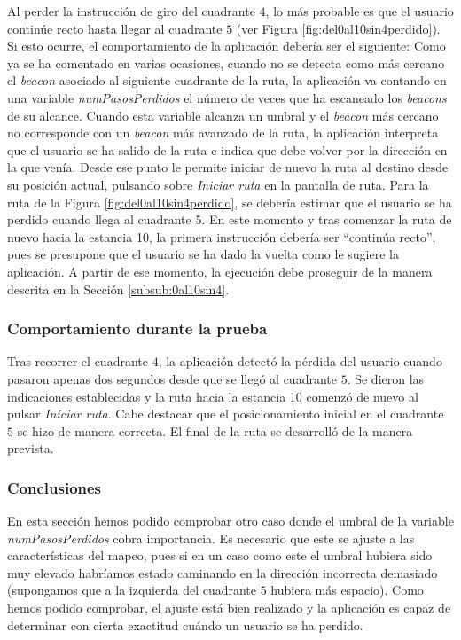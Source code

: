 Al perder la instrucción de giro del cuadrante $4$, lo más probable es que el usuario continúe recto hasta llegar al cuadrante $5$ (ver Figura \ref{fig:del0al10sin4perdido}). Si esto ocurre, el comportamiento de la aplicación debería ser el siguiente: Como ya se ha comentado en varias ocasiones, cuando no se detecta como más cercano el \textit{beacon} asociado al siguiente cuadrante de la ruta, la aplicación va contando en una variable \textit{numPasosPerdidos} el número de veces que ha escaneado los \textit{beacons} de su alcance. Cuando esta variable alcanza un umbral y el \textit{beacon} más cercano no corresponde con un \textit{beacon} más avanzado de la ruta, la aplicación interpreta que el usuario se ha salido de la ruta e indica que debe volver por la dirección en la que venía. Desde ese punto le permite iniciar de nuevo la ruta al destino desde su posición actual, pulsando sobre \textit{Iniciar ruta} en la pantalla de ruta. Para la ruta de la Figura \ref{fig:del0al10sin4perdido}, se debería estimar que el usuario se ha perdido cuando llega al cuadrante $5$. En este momento y tras comenzar la ruta de nuevo hacia la estancia 10, la primera instrucción debería ser ``continúa recto'', pues se presupone que el usuario se ha dado la vuelta como le sugiere la aplicación. A partir de ese momento, la ejecución debe proseguir de la manera descrita en la Sección \ref{subsub:0al10sin4}.

\subsubsection*{Comportamiento durante la prueba}

Tras recorrer el cuadrante $4$, la aplicación detectó la pérdida del usuario cuando pasaron apenas dos segundos desde que se llegó al cuadrante $5$. Se dieron las indicaciones establecidas y la ruta hacia la estancia 10 comenzó de nuevo al pulsar \textit{Iniciar ruta}. Cabe destacar que el posicionamiento inicial en el cuadrante $5$ se hizo de manera correcta. El final de la ruta se desarrolló de la manera prevista.

\subsubsection*{Conclusiones}

En esta sección hemos podido comprobar otro caso donde el umbral de la variable \textit{numPasosPerdidos} cobra importancia. Es necesario que este se ajuste a las características del mapeo, pues si en un caso como este el umbral hubiera sido muy elevado habríamos estado caminando en la dirección incorrecta demasiado (supongamos que a la izquierda del cuadrante $5$ hubiera más espacio). Como hemos podido comprobar, el ajuste está bien realizado y la aplicación es capaz de determinar con cierta exactitud cuándo un usuario se ha perdido.


